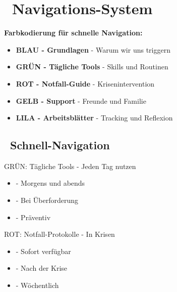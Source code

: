 \section*{\textcolor{ctmmBlue}{\faMap~Navigations-System}}
\label{sec:navigation}

\begin{ctmmBlueBox}[title=Orientierung im CTMM-System]
\textbf{Farbkodierung für schnelle Navigation:}

\begin{itemize}
    \item \textcolor{ctmmBlue}{\textbf{BLAU - Grundlagen}} - Warum wir uns triggern
    \item \textcolor{ctmmGreen}{\textbf{GRÜN - Tägliche Tools}} - Skills und Routinen
    \item \textcolor{ctmmRed}{\textbf{ROT - Notfall-Guide}} - Krisenintervention
    \item \textcolor{ctmmYellow}{\textbf{GELB - Support}} - Freunde und Familie
    \item \textcolor{ctmmPurple}{\textbf{LILA - Arbeitsblätter}} - Tracking und Reflexion
\end{itemize}
\end{ctmmBlueBox}

\vspace{0.5cm}

\subsection*{\faChevronRight~Schnell-Navigation}

\begin{ctmmGreenBox}{GRÜN: Tägliche Tools - Jeden Tag nutzen}
\begin{itemize}
    \item {} - Morgens und abends
    \item {} - Bei Überforderung
    \item {} - Präventiv
\end{itemize}
\end{ctmmGreenBox}

\begin{ctmmRedBox}{ROT: Notfall-Protokolle - In Krisen}
\begin{itemize}
    \item {} - Sofort verfügbar
    \item {} - Nach der Krise
    \item {} - Wöchentlich
\end{itemize}
\end{ctmmRedBox}

